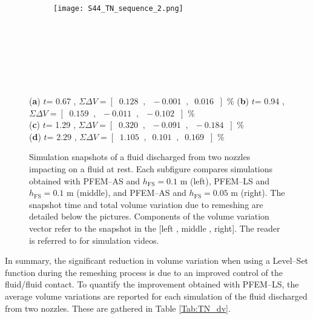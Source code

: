 \documentclass[final,3p,times]{elsarticle}
\begin{document}
\begin{figure}[t!]
\captionsetup[subfigure]{labelformat=empty}
\centering 
	\begin{subfigure}[b]{1.0\textwidth}
		\texttt{[image: S44\_TN\_sequence\_2.png]}
		\caption{}
		\label{Fig:TN_a}
	\end{subfigure}
	~
	\begin{subfigure}[b]{0.0\textwidth}\caption{}\label{Fig:TN_b}
	\end{subfigure}
	~
	\begin{subfigure}[b]{0.0\textwidth}\caption{}\label{Fig:TN_c}
	\end{subfigure}
	~
	\begin{subfigure}[b]{0.0\textwidth}\caption{}\label{Fig:TN_d}
	\end{subfigure}
	\\
	\vspace{-93mm}
	\hspace{-10mm} 
	\footnotesize{(\textbf{a}) $t$= 0.67 , $\Sigma \Delta V= [\;\;0.128 \;\;,\;\; -0.001 \;\;,\;\; 0.016 \;\;]$ $\%$}
	\hspace{20mm} 
	(\textbf{b}) $t$= 0.94 , $\Sigma \Delta V= [\;\;0.159 \;\;,\;\; -0.011 \;\;,\;\; -0.102 \;\;]$ $\%$
	\\
	\vspace{35mm}
	\hspace{-4mm} 
	(\textbf{c}) $t$= 1.29 , $\Sigma \Delta V= [\;\;0.320 \;\;,\;\; -0.091 \;\;,\;\; -0.184 \;\;]$ $\%$ 
	\vspace{40mm}
	\\
	\hspace{-5mm} 
	(\textbf{d}) $t$= 2.29 , $\Sigma \Delta V= [\;\;1.105 \;\;,\;\; 0.101 \;\;,\;\; 0.169 \;\;]$ $\%$ 	 
	\vspace{2mm}
\caption{Simulation snapshots of a fluid discharged from two nozzles impacting on a fluid at rest. Each subfigure compares simulations obtained with PFEM--AS and $h_\mathrm{FS} = 0.1$ m (left), PFEM--LS and $h_\mathrm{FS} = 0.1$ m (middle), and PFEM--AS and $h_\mathrm{FS} = 0.05$ m (right). The snapshot time and total volume variation due to remeshing are detailed below the pictures. Components of the volume variation vector refer to the snapshot in the [left , middle , right]. The reader is referred to \citep{YoutubeAll} for simulation videos.
}
\label{Fig:TN}
\end{figure}


In summary, the significant reduction in volume variation when using a Level--Set function during the remeshing process is due to an improved control of the fluid/fluid contact. To quantify the improvement obtained with PFEM--LS, the average volume variations are reported for each simulation of the fluid discharged from two nozzles. These are gathered in Table \ref{Tab:TN_dv}.
\end{document}
